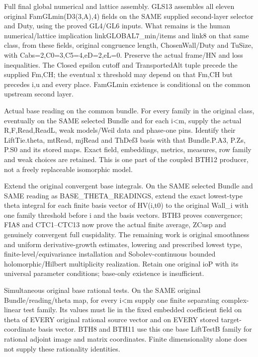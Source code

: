 \begin{description}[style=nextline]
\item[31. TASK\_GL\_FINAL\_ASSEMBLY --- B] Full final global numerical and lattice assembly. GLS13 assembles all eleven original FamGLmin(D3(3,A),4) fields on the SAME supplied second-layer selector and Duty, using the proved GL4/GL6 inputs. What remains is the human numerical/lattice implication linkGLOBAL7\_min/items and link8 on that same class, from these fields, original congruence length, ChosenWall/Duty and TuSize, with Cabs=2,C0=3,C5=4,eD=2,eL=0. Preserve the actual frame/HN and loss inequalities. The Closed epsilon cutoff and TransportedAlt tuple precede the supplied Fm,CH; the eventual x threshold may depend on that Fm,CH but precedes i,u and every place. FamGLmin existence is conditional on the common upstream second layer.

\item[32. BASE\_THETA\_READINGS --- C] Actual base reading on the common bundle. For every family in the original class, eventually on the SAME selected Bundle and for each i<m, supply the actual R,F,Read,ReadL, weak models/Weil data and phase-one pins. Identify their LiftTie.theta, mtRead, mjRead and ThDef3 basis with that Bundle.P.A3, P.Zs, P.S0 and its stored maps. Exact field, embeddings, metrics, measures, row family and weak choices are retained. This is one part of the coupled BTH12 producer, not a freely replaceable isomorphic model.

\item[33. BASE\_THETA\_CUSPIDAL\_EXTENSION --- C] Extend the original convergent base integrals. On the SAME selected Bundle and SAME reading as BASE\_THETA\_READINGS, extend the exact lowest-type theta integral for each finite basis vector of HV(i,t0) to the original Wall\_i with one family threshold before i and the basis vectors. BTH3 proves convergence; FIA8 and CTC1–CTC13 now prove the actual finite average, ZCusp and genuinely convergent full cuspidality. The remaining work is original smoothness and uniform derivative-growth estimates, lowering and prescribed lowest type, finite-level/equivariance installation and Sobolev-continuous bounded holomorphic/Hilbert multiplicity realization. Retain one original ioP with its universal parameter conditions; base-only existence is insufficient.

\item[34. BASE\_THETA\_RATIONAL\_TESTS --- C] Simultaneous original base rational tests. On the SAME original Bundle/reading/theta map, for every i<m supply one finite separating complex-linear test family. Its values must lie in the fixed embedded coefficient field on theta of EVERY original rational source vector and on EVERY stored target-coordinate basis vector. BTH8 and BTH11 use this one base LiftTestB family for rational adjoint image and matrix coordinates. Finite dimensionality alone does not supply these rationality identities.


\end{description}
